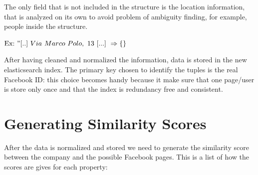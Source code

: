 The only field that is not included in the structure is the location information, that is analyzed on its own to avoid problem of ambiguity finding, for example, people inside the structure.

$ \text{Ex:}\ "[..]\ Via\ Marco\ Polo,\ 13\ [...]\ \Rightarrow \{\} $

After having cleaned and normalized the information, data is stored in the new elasticsearch index. The primary key chosen to identify the tuples is the real Facebook ID: this choice becomes handy because it make sure that one page/user is store only once and that the index is redundancy free and consistent.

\section{Generating Similarity Scores}
After the data is normalized and stored we need to generate the similarity score between the company and the possible Facebook pages. This is a list of how the scores are gives for each property:

